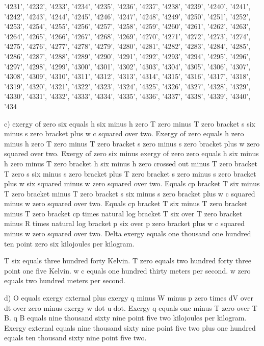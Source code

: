'4231', '4232', '4233', '4234', '4235', '4236', '4237', '4238', '4239', '4240', '4241', '4242', '4243', '4244', '4245', '4246', '4247', '4248', '4249', '4250', '4251', '4252', '4253', '4254', '4255', '4256', '4257', '4258', '4259', '4260', '4261', '4262', '4263', '4264', '4265', '4266', '4267', '4268', '4269', '4270', '4271', '4272', '4273', '4274', '4275', '4276', '4277', '4278', '4279', '4280', '4281', '4282', '4283', '4284', '4285', '4286', '4287', '4288', '4289', '4290', '4291', '4292', '4293', '4294', '4295', '4296', '4297', '4298', '4299', '4300', '4301', '4302', '4303', '4304', '4305', '4306', '4307', '4308', '4309', '4310', '4311', '4312', '4313', '4314', '4315', '4316', '4317', '4318', '4319', '4320', '4321', '4322', '4323', '4324', '4325', '4326', '4327', '4328', '4329', '4330', '4331', '4332', '4333', '4334', '4335', '4336', '4337', '4338', '4339', '4340', '434

c) exergy of zero six equals h six minus h zero T zero minus T zero bracket s six minus s zero bracket plus w c squared over two. Exergy of zero equals h zero minus h zero T zero minus T zero bracket s zero minus s zero bracket plus w zero squared over two. Exergy of zero six minus exergy of zero zero equals h six minus h zero minus T zero bracket h six minus h zero crossed out minus T zero bracket T zero s six minus s zero bracket plus T zero bracket s zero minus s zero bracket plus w six squared minus w zero squared over two. Equals cp bracket T six minus T zero bracket minus T zero bracket s six minus s zero bracket plus w c squared minus w zero squared over two. Equals cp bracket T six minus T zero bracket minus T zero bracket cp times natural log bracket T six over T zero bracket minus R times natural log bracket p six over p zero bracket plus w c squared minus w zero squared over two. Delta exergy equals one thousand one hundred ten point zero six kilojoules per kilogram.

T six equals three hundred forty Kelvin. T zero equals two hundred forty three point one five Kelvin. w c equals one hundred thirty meters per second. w zero equals two hundred meters per second.

d) O equals exergy external plus exergy q minus W minus p zero times dV over dt over zero minus exergy w dot u dot. Exergy q equals one minus T zero over T B. q B equals nine thousand sixty nine point five two kilojoules per kilogram. Exergy external equals nine thousand sixty nine point five two plus one hundred equals ten thousand sixty nine point five two.